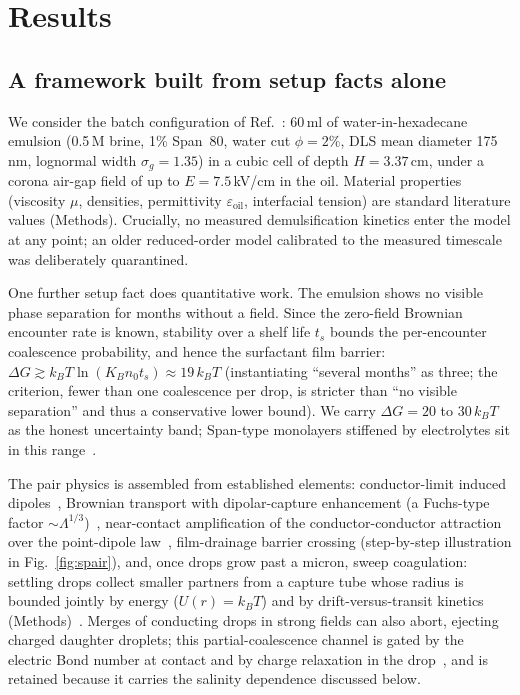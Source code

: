 \documentclass[aps,prfluids,reprint,amsmath,amssymb,superscriptaddress,longbibliography]{revtex4-2}
\begin{document}
\section{Results}

\subsection{A framework built from setup facts alone}

We consider the batch configuration of Ref.~\cite{panat2025}: 60\,ml of
water-in-hexadecane emulsion (0.5\,M brine, 1\% Span~80, water cut
$\phi=2\%$, DLS mean diameter 175\,nm, lognormal width $\sigma_g=1.35$) in a
cubic cell of depth $H=3.37$\,cm, under a corona air-gap field of up to
$E=7.5$\,kV/cm in the oil. Material properties (viscosity $\mu$, densities,
permittivity $\varepsilon_{\mathrm{oil}}$, interfacial tension) are standard
literature values (Methods). Crucially, no measured demulsification kinetics
enter the model at any point; an older reduced-order model calibrated to the
measured timescale was deliberately quarantined.

One further setup fact does quantitative work. The emulsion shows no visible
phase separation for months without a field. Since the zero-field Brownian
encounter rate is known, stability over a shelf life $t_s$ bounds the
per-encounter coalescence probability, and hence the surfactant film barrier:
$\Delta G \gtrsim k_BT\ln(K_Bn_0t_s)\approx 19\,k_BT$ (instantiating
``several months'' as three; the criterion, fewer than one coalescence per
drop, is stricter than ``no visible separation'' and thus a conservative
lower bound). We carry
$\Delta G=20$ to $30\,k_BT$ as the honest uncertainty band; Span-type
monolayers stiffened by electrolytes sit in this range~\cite{opawale1998}.

The pair physics is assembled from established elements: conductor-limit
induced dipoles~\cite{jones1995}, Brownian transport with
dipolar-capture enhancement (a Fuchs-type factor
$\sim\Lambda^{1/3}$)~\cite{fuchs1934,friedlander2000}, near-contact
amplification of the conductor-conductor attraction over the point-dipole
law~\cite{davis1964,zhang1995}, film-drainage barrier crossing (step-by-step illustration in Fig.~\ref{fig:spair}), and, once
drops grow past a micron, sweep coagulation: settling drops collect smaller
partners from a capture tube whose radius is bounded jointly by energy
($U(r)\!=\!k_BT$) and by drift-versus-transit kinetics
(Methods)~\cite{pruppacher1997,friedlander2000}. Merges of conducting drops
in strong fields can also abort, ejecting charged daughter droplets; this
partial-coalescence channel is gated by the electric Bond number at contact
and by charge relaxation in the drop~\cite{ristenpart2009,bird2009,
mousavichoubeh2011}, and is retained because it carries the salinity
dependence discussed below.
\end{document}
